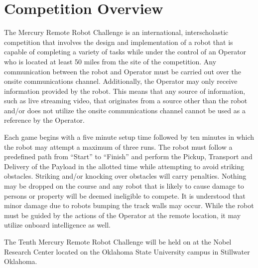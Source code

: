 \section{Competition Overview}
The Mercury Remote Robot Challenge is an international, interscholastic competition that involves the design and implementation of a robot that is capable of completing a variety of tasks while under the control of an Operator who is located at least 50 miles from the site of the competition. Any communication between the robot and Operator must be carried out over the onsite communications channel. Additionally, the Operator may only receive information provided by the robot. This means that any source of information, such as live streaming video, that originates from a source other than the robot and/or does not utilize the onsite communications channel cannot be used as a reference by the Operator.

Each game begins with a five minute setup time followed by ten minutes in which the robot may attempt a maximum of three runs. The robot must follow a predefined path from “Start” to “Finish” and perform the Pickup, Transport and Delivery of the Payload in the allotted time while attempting to avoid striking obstacles. Striking and/or knocking over obstacles will carry penalties. Nothing may be dropped on the course and any robot that is likely to cause damage to persons or property will be deemed ineligible to compete. It is understood that minor damage due to robots bumping the track walls may occur. While the robot must be guided by the actions of the Operator at the remote location, it may utilize onboard intelligence as well.

The Tenth Mercury Remote Robot Challenge will be held on \textbf{\competition} at the Nobel Research Center located on the Oklahoma State University campus in Stillwater Oklahoma.